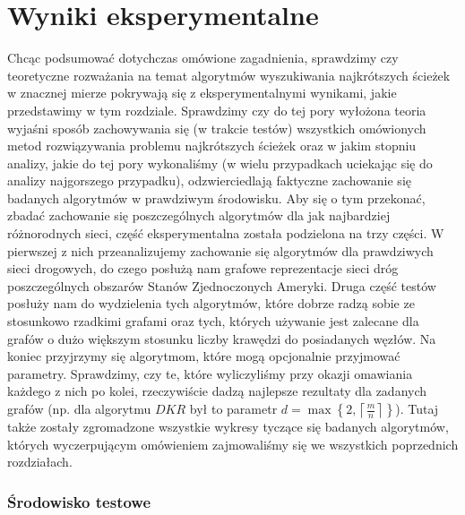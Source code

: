 \chapter{Wyniki eksperymentalne}
\thispagestyle{chapterBeginStyle}





Chcąc podsumować dotychczas omówione zagadnienia, sprawdzimy czy teoretyczne rozważania na temat algorytmów wyszukiwania najkrótszych ścieżek w znacznej mierze pokrywają się z eksperymentalnymi wynikami, jakie przedstawimy w tym rozdziale.
Sprawdzimy czy do tej pory wyłożona teoria wyjaśni sposób zachowywania się (w trakcie testów) wszystkich omówionych metod rozwiązywania problemu najkrótszych ścieżek oraz w jakim stopniu analizy, jakie do tej pory wykonaliśmy (w wielu przypadkach uciekając się do analizy najgorszego przypadku), odzwierciedlają faktyczne zachowanie się badanych algorytmów w prawdziwym środowisku.
Aby się o tym przekonać, zbadać zachowanie się poszczególnych algorytmów dla jak najbardziej różnorodnych sieci, część eksperymentalna została podzielona na trzy części.
W pierwszej z nich przeanalizujemy zachowanie się algorytmów dla prawdziwych sieci drogowych, do czego posłużą nam grafowe reprezentacje sieci dróg poszczególnych obszarów Stanów Zjednoczonych Ameryki.
Druga część testów posłuży nam do wydzielenia tych algorytmów, które dobrze radzą sobie ze stosunkowo rzadkimi grafami oraz tych, których używanie jest zalecane dla grafów o dużo większym stosunku liczby krawędzi do posiadanych węzłów.
Na koniec przyjrzymy się algorytmom, które mogą opcjonalnie przyjmować parametry.
Sprawdzimy, czy te, które wyliczyliśmy przy okazji omawiania każdego z nich po kolei, rzeczywiście dadzą najlepsze rezultaty dla zadanych grafów (np. dla algorytmu $DKR$ był to parametr $d = \max \left\{ 2, \left\lceil \frac{m}{n} \right\rceil \right\}$).
Tutaj także zostały zgromadzone wszystkie wykresy tyczące się badanych algorytmów, których wyczerpującym omówieniem zajmowaliśmy się we wszystkich poprzednich rozdziałach.



\subsection{Środowisko testowe}



